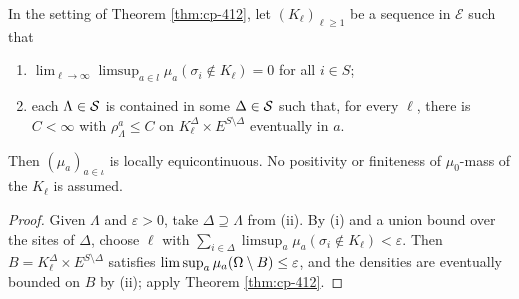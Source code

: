 \begin{corollary}
    \label{cor:cp-413}
    \leanok

    In the setting of Theorem \ref{thm:cp-412}, let $(K_\ell)_{\ell \geq 1}$ be a sequence in
    $\mathcal{E}$ such that
    \begin{enumerate}
        \item $\lim_{\ell \to \infty} \limsup_{a \in l} \mu_a(\sigma_i \notin K_\ell) = 0$ for
              all $i \in S$;
        \item each $\Lambda \in \mathcal{S}$ is contained in some $\Delta \in \mathcal{S}$ such that, for every
              $\ell$, there is $C < \infty$ with $\rho^a_\Lambda \leq C$ on
              $K_\ell^\Delta \times E^{S \setminus \Delta}$ eventually in $a$.
    \end{enumerate}
    Then $(\mu_a)_{a \in \iota}$ is locally equicontinuous. No positivity or finiteness of
    $\mu_0$-mass of the $K_\ell$ is assumed.
\end{corollary}
\begin{proof}
    \leanok

    Given $\Lambda$ and $\varepsilon > 0$, take $\Delta \supseteq \Lambda$ from (ii). By (i) and
    a union bound over the sites of $\Delta$, choose $\ell$ with
    $\sum_{i \in \Delta}\limsup_a \mu_a(\sigma_i \notin K_\ell) < \varepsilon$. Then
    $B = K_\ell^\Delta \times E^{S\setminus\Delta}$ satisfies
    $\limsup_a \mu_a(\Omega\setminus B) \leq \varepsilon$, and the densities are eventually
    bounded on $B$ by (ii); apply Theorem \ref{thm:cp-412}.
\end{proof}

